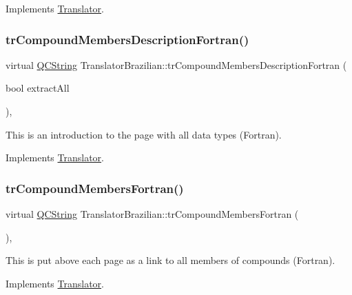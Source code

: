 Implements \mbox{\hyperlink{class_translator}{Translator}}.

\mbox{\label{class_translator_brazilian_a845bb6e3a2b1dfc7008d031771e4aae8}} 
\subsubsection{\texorpdfstring{trCompoundMembersDescriptionFortran()}{trCompoundMembersDescriptionFortran()}}
{\footnotesize\ttfamily virtual \mbox{\hyperlink{class_q_c_string}{Q\+C\+String}} Translator\+Brazilian\+::tr\+Compound\+Members\+Description\+Fortran (\begin{DoxyParamCaption}\item[{bool}]{extract\+All }\end{DoxyParamCaption})\hspace{0.3cm}{\ttfamily [inline]}, {\ttfamily [virtual]}}

This is an introduction to the page with all data types (Fortran). 

Implements \mbox{\hyperlink{class_translator}{Translator}}.

\mbox{\label{class_translator_brazilian_ab36cc2f58d24db34e4f170820ca7c31f}} 
\subsubsection{\texorpdfstring{trCompoundMembersFortran()}{trCompoundMembersFortran()}}
{\footnotesize\ttfamily virtual \mbox{\hyperlink{class_q_c_string}{Q\+C\+String}} Translator\+Brazilian\+::tr\+Compound\+Members\+Fortran (\begin{DoxyParamCaption}{ }\end{DoxyParamCaption})\hspace{0.3cm}{\ttfamily [inline]}, {\ttfamily [virtual]}}

This is put above each page as a link to all members of compounds (Fortran). 

Implements \mbox{\hyperlink{class_translator}{Translator}}.

